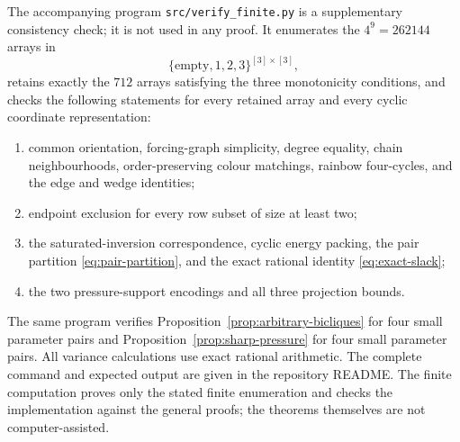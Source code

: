 \documentclass[11pt]{article}
\numberwithin{equation}{section}
\theoremstyle{definition}
\theoremstyle{remark}
\begin{document}
The accompanying program \texttt{src/verify\_finite.py} is a supplementary
consistency check; it is not used in any proof.  It enumerates the
$4^9=262144$ arrays in
\[
 \{\text{empty},1,2,3\}^{[3]\times[3]},
\]
retains exactly the $712$ arrays satisfying the three monotonicity conditions,
and checks the following statements for every retained array and every cyclic
coordinate representation:
\begin{enumerate}[label=(\roman*)]
\item common orientation, forcing-graph simplicity, degree equality, chain
neighbourhoods, order-preserving colour matchings, rainbow four-cycles, and
the edge and wedge identities;
\item endpoint exclusion for every row subset of size at least two;
\item the saturated-inversion correspondence, cyclic energy packing, the
pair partition \eqref{eq:pair-partition}, and the exact rational identity
\eqref{eq:exact-slack};
\item the two pressure-support encodings and all three projection bounds.
\end{enumerate}
The same program verifies Proposition~\ref{prop:arbitrary-bicliques} for four
small parameter pairs and Proposition~\ref{prop:sharp-pressure} for four
small parameter pairs.  All variance calculations use exact rational
arithmetic.  The complete command and expected output are given in the
repository README.  The finite computation proves only the stated finite
enumeration and checks the implementation against the general proofs; the
theorems themselves are not computer-assisted.
\end{document}
